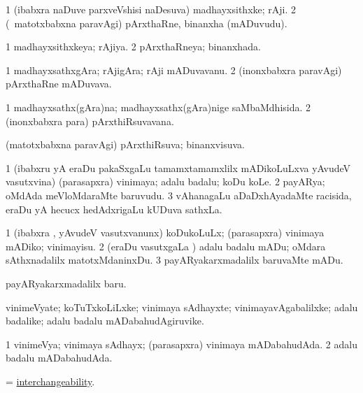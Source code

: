 \bentry
{}
\gl{\nA}
\bmng
\bnum
\num{1} (ibabxra naDuve parxveVshisi naDesuva) madhayxsithxke; rAji. 
\num{2} (\kanmu\ matotxbabxna paravAgi) pArxthaRne, binanxha (mADuvudu). 
\enum
\emng
\eentry

\bentry
{}
\gl{\gu}
\bmng
\bnum
\num{1} madhayxsithxkeya; rAjiya. 
\num{2} pArxthaRneya; binanxhada. 
\enum
\emng
\eentry

\bentry
{}
\gl{\nA}
\bmng
\bnum
\num{1} madhayxsathxgAra; rAjigAra; rAji mADuvavanu. 
\num{2} (inonxbabxra paravAgi) pArxthaRne mADuvava. 
\enum
\emng
\eentry

\bentry
{}
\gl{\gu}
\bmng
\bnum
\num{1} madhayxsathx(gAra)na; madhayxsathx(gAra)nige saMbaMdhisida. 
\num{2} (inonxbabxra para) pArxthiRsuvavana. 
\enum
\emng
\eentry

\bentry
{}
\gl{\gu}
\bmng
(matotxbabxna paravAgi) pArxthiRsuva; binanxvisuva. 
\emng
\eentry

\bentry
{}
\gl{\nA}
\bmng
\bnum
\num{1} (ibabxru yA eraDu pakaSxgaLu tamamxtamamxlilx mADikoLuLxva yAvudeV vasutxvina) (parasapxra) vinimaya; adalu badalu; koDu koLe. 
\num{2} payARya; oMdAda meVloMdaraMte baruvudu. 
\num{3} vAhanagaLu aDaDxhAyadaMte racisida, eraDu yA hecucx hedAdxrigaLu kUDuva sathxLa. 
\enum
\emng
\eentry

\bentry
{}
\gl{\sakirx}
\bmng
\bnum
\num{1} (ibabxra \vi, yAvudeV vasutxvanunx) koDukoLuLx; (parasapxra) vinimaya mADiko; vinimayisu. 
\num{2} (eraDu vasutxgaLa \vi) adalu badalu mADu; oMdara sAthxnadalilx matotxMdaninxDu. 
\num{3} payARyakarxmadalilx baruvaMte mADu. 
\enum
\emng

\noindent
\gl{\akirx}
\bmng
payARyakarxmadalilx baru. 
\emng
\eentry

\bentry
{}
\gl{\nA}
\bmng
vinimeVyate; koTuTxkoLiLxke; vinimaya sAdhayxte; vinimayavAgabalilxke; adalu badalike; adalu badalu mADabahudAgiruvike. 
\emng
\eentry

\bentry
{}
\gl{\gu}
\bmng
\bnum
\num{1} vinimeVya; vinimaya sAdhayx; (parasapxra) vinimaya mADabahudAda. 
\num{2} adalu badalu mADabahudAda. 
\enum
\emng
\eentry

\bentry
{}
\gl{\nA}
\bmng
= \hyperlink{interchangeability}{interchangeability}. 
\emng
\eentry

